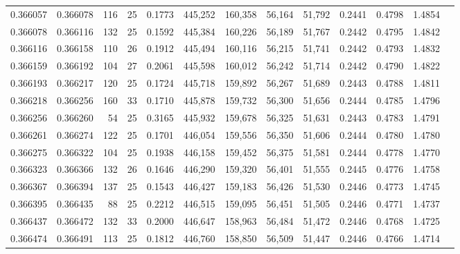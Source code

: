 \begin{tabular}{rrrrrrrrrrrrr}
0.366057 & 0.366078 &   116 &  25 &                                     0.1773 & 445,252 & 160,358 &  56,164 &  51,792 & 0.2441 & 0.4798 & 1.4854 \\
0.366078 & 0.366116 &   132 &  25 &                                     0.1592 & 445,384 & 160,226 &  56,189 &  51,767 & 0.2442 & 0.4795 & 1.4842 \\
0.366116 & 0.366158 &   110 &  26 &                                     0.1912 & 445,494 & 160,116 &  56,215 &  51,741 & 0.2442 & 0.4793 & 1.4832 \\
0.366159 & 0.366192 &   104 &  27 &                                     0.2061 & 445,598 & 160,012 &  56,242 &  51,714 & 0.2442 & 0.4790 & 1.4822 \\
0.366193 & 0.366217 &   120 &  25 &                                     0.1724 & 445,718 & 159,892 &  56,267 &  51,689 & 0.2443 & 0.4788 & 1.4811 \\
0.366218 & 0.366256 &   160 &  33 &                                     0.1710 & 445,878 & 159,732 &  56,300 &  51,656 & 0.2444 & 0.4785 & 1.4796 \\
0.366256 & 0.366260 &    54 &  25 &                                     0.3165 & 445,932 & 159,678 &  56,325 &  51,631 & 0.2443 & 0.4783 & 1.4791 \\
0.366261 & 0.366274 &   122 &  25 &                                     0.1701 & 446,054 & 159,556 &  56,350 &  51,606 & 0.2444 & 0.4780 & 1.4780 \\
0.366275 & 0.366322 &   104 &  25 &                                     0.1938 & 446,158 & 159,452 &  56,375 &  51,581 & 0.2444 & 0.4778 & 1.4770 \\
0.366323 & 0.366366 &   132 &  26 &                                     0.1646 & 446,290 & 159,320 &  56,401 &  51,555 & 0.2445 & 0.4776 & 1.4758 \\
0.366367 & 0.366394 &   137 &  25 &                                     0.1543 & 446,427 & 159,183 &  56,426 &  51,530 & 0.2446 & 0.4773 & 1.4745 \\
0.366395 & 0.366435 &    88 &  25 &                                     0.2212 & 446,515 & 159,095 &  56,451 &  51,505 & 0.2446 & 0.4771 & 1.4737 \\
0.366437 & 0.366472 &   132 &  33 &                                     0.2000 & 446,647 & 158,963 &  56,484 &  51,472 & 0.2446 & 0.4768 & 1.4725 \\
0.366474 & 0.366491 &   113 &  25 &                                     0.1812 & 446,760 & 158,850 &  56,509 &  51,447 & 0.2446 & 0.4766 & 1.4714 \\

\end{tabular}
